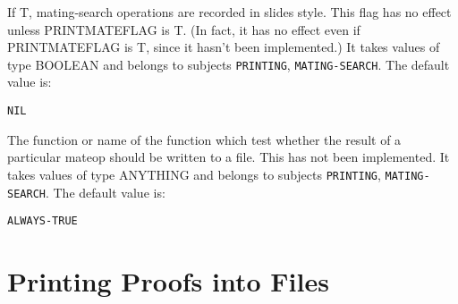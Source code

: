 \begin{description}
\item[PRINTMATEFLAG-SLIDES]  
If T, mating-search operations are recorded in slides style. This flag has 
no effect unless PRINTMATEFLAG is T. (In fact, it has no effect even if 
PRINTMATEFLAG is T, since it hasn't been implemented.)
It takes values of type BOOLEAN and belongs to subjects \texttt{PRINTING}, \texttt{MATING-SEARCH}.  The default value is: \begin{lstlisting}
NIL
\end{lstlisting}

\item[PRINTMATEOPS]  
The function or name of the function which test whether the
result of a particular mateop should be written to a file. This has not
been implemented.
It takes values of type ANYTHING and belongs to subjects \texttt{PRINTING}, \texttt{MATING-SEARCH}.  The default value is: \begin{lstlisting}
ALWAYS-TRUE
\end{lstlisting}

\item
\end{description}

\section{Printing Proofs into Files}

